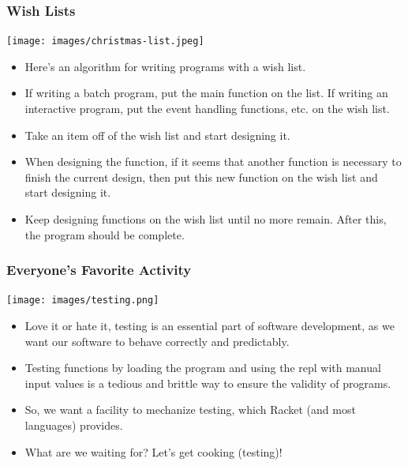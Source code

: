 \documentclass{beamer}
\begin{document}
\begin{frame}
  \frametitle{Wish Lists}
  \begin{center}
    \texttt{[image: images/christmas-list.jpeg]}
  \end{center}
  \begin{itemize}
  \item<2-> Here's an algorithm for writing programs with a wish list.
  \item<3-> If writing a batch program, put the main function on the list. If writing an interactive program, put the event handling functions, etc. on the wish list.
  \item<4-> Take an item off of the wish list and start designing it.
  \item<5-> When designing the function, if it seems that another function is necessary to finish the current design, then put this new function on the wish list and
    start designing it.
  \item<6-> Keep designing functions on the wish list until no more remain. After this, the program should be complete.
  \end{itemize}
\end{frame}

\begin{frame}
  \frametitle{Everyone's Favorite Activity}
  \begin{center}
    \texttt{[image: images/testing.png]}
  \end{center}
  \begin{itemize}
  \item<2-> Love it or hate it, testing is an essential part of software development, as we want our software to behave correctly and predictably. 
  \item<3-> Testing functions by loading the program and using the repl with manual input values is a tedious and brittle way to ensure the validity of programs.
  \item<4-> So, we want a facility to mechanize testing, which Racket (and most languages) provides.
  \item<5-> What are we waiting for? Let's get cooking (testing)!
  \end{itemize}
\end{frame}

\end{document}
